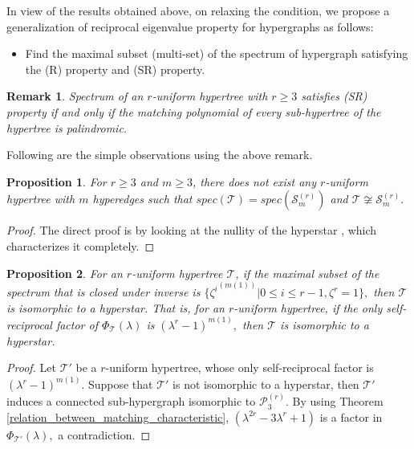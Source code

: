 \documentclass[10pt,a4paper]{article}
\newtheorem{proposition}{Proposition}[section]
\newtheorem{remark}{Remark}[section]
\begin{document}
	
	In view of the results obtained above, on relaxing the condition, we propose a generalization of reciprocal eigenvalue property for hypergraphs as follows:
	\begin{itemize}
		\item Find the maximal subset (multi-set) of the spectrum of  hypergraph satisfying the (R) property and (SR) property. 
	\end{itemize}
	
	\begin{remark}\label{char_match_remark}
		Spectrum of an $r$-uniform hypertree with $r \geq 3$ satisfies (SR) property if and only if the matching polynomial of every sub-hypertree of the hypertree is palindromic.
	\end{remark}
	
	Following are the simple observations using the above remark. 
	
	\begin{proposition}
		For $r\geq 3$ and $m \geq 3$, there does not exist any $r$-uniform hypertree with $m$ hyperedges such that $spec(\mathcal{T}) = spec(\mathcal{S}_m^{(r)})$ and $\mathcal{T} \not\cong \mathcal{S}_m^{(r)}.$
	\end{proposition}
	\begin{proof}
		The direct proof is by looking at the nullity of the hyperstar \cite{zheng2025uniform}, which characterizes it completely.
	\end{proof}
	
	
	\begin{proposition}
		For an $r$-uniform hypertree $\mathcal{T}$, if the maximal subset of the spectrum that is closed under inverse is $\{ {\zeta^i}^{(m(1))} | 0 \leq i \leq r-1, \zeta^r=1 \},$  then $\mathcal{T}$ is isomorphic to a hyperstar. 
		That is, for an $r$-uniform hypertree, if the only self-reciprocal factor of $\Phi_{\mathcal{T}}(\lambda)$ is $(\lambda^r-1)^{m(1)},$ then $\mathcal{T}$ is isomorphic  to a hyperstar. 
	\end{proposition}
	\begin{proof}
		Let $\mathcal{T}'$ be a $r$-uniform hypertree, whose only self-reciprocal factor is $(\lambda^r-1)^{m(1)}$. Suppose that $\mathcal{T}'$ is not isomorphic to a hyperstar, then $\mathcal{T}'$ induces a connected sub-hypergraph isomorphic to $\mathcal{P}_3^{(r)}$. By using Theorem \ref{relation_between_matching_characteristic}, $(\lambda^{2r}-3\lambda^r+1)$ is a factor in $\Phi_{\mathcal{T}'}(\lambda),$ a contradiction.  
	\end{proof}
	
\end{document}

